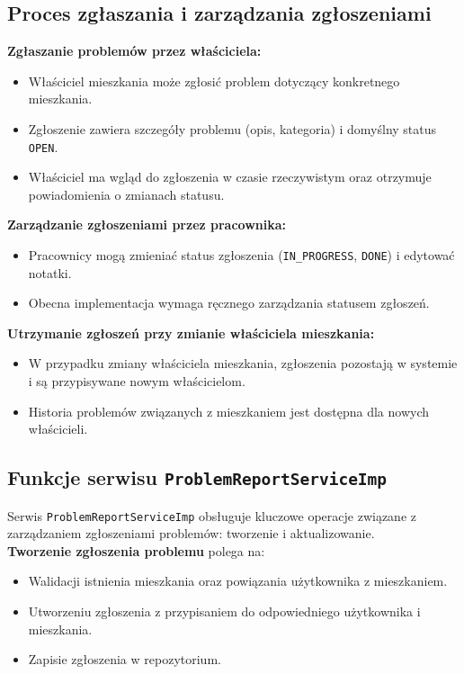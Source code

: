 \subsection{Proces zgłaszania i zarządzania zgłoszeniami}

\textbf{Zgłaszanie problemów przez właściciela:}
\begin{itemize}
    \item Właściciel mieszkania może zgłosić problem dotyczący konkretnego mieszkania.
    \item Zgłoszenie zawiera szczegóły problemu (opis, kategoria) i domyślny status \texttt{OPEN}.
    \item Właściciel ma wgląd do zgłoszenia w czasie rzeczywistym oraz otrzymuje powiadomienia o zmianach statusu.
\end{itemize}

\noindent \textbf{Zarządzanie zgłoszeniami przez pracownika:}
\begin{itemize}
    \item Pracownicy mogą zmieniać status zgłoszenia (\texttt{IN\_PROGRESS}, \texttt{DONE}) i edytować notatki.
    \item Obecna implementacja wymaga ręcznego zarządzania statusem zgłoszeń.
\end{itemize}

\noindent \textbf{Utrzymanie zgłoszeń przy zmianie właściciela mieszkania:}
\begin{itemize}
    \item W przypadku zmiany właściciela mieszkania, zgłoszenia pozostają w systemie i są przypisywane nowym właścicielom.
    \item Historia problemów związanych z mieszkaniem jest dostępna dla nowych właścicieli.
\end{itemize}

\subsection{Funkcje serwisu \texttt{ProblemReportServiceImp}}

Serwis \texttt{ProblemReportServiceImp} obsługuje kluczowe operacje związane z zarządzaniem zgłoszeniami problemów: tworzenie i aktualizowanie.\\[-10pt]

\noindent \textbf{Tworzenie zgłoszenia problemu} polega na:
\begin{itemize}
    \item Walidacji istnienia mieszkania oraz powiązania użytkownika z mieszkaniem.
    \item Utworzeniu zgłoszenia z przypisaniem do odpowiedniego użytkownika i mieszkania.
    \item Zapisie zgłoszenia w repozytorium.
\end{itemize}

